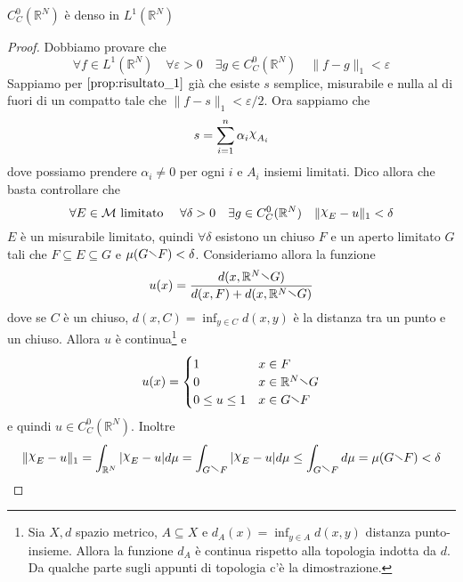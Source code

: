 \begin{proposition}\label{prop:risultato_2}
    \(C_C^{0}{(\mathbb{R}^{N})}\) è denso in \(L^1(\mathbb{R}^{N})\)
\end{proposition}
\begin{proof}
    Dobbiamo provare che 
    \[
        \forall f \in L^1(\mathbb{R}^{N}) \quad \forall \varepsilon > 0 \quad \exists g \in C_C^{0}{(\mathbb{R}^{N})} \quad \|f - g\|_1 < \varepsilon
    \]
    Sappiamo per \(\ref{prop:risultato_1}\) già che esiste \(s\) semplice, misurabile e nulla al di fuori di un
    compatto tale che \(\|f - s\|_1 < \varepsilon/2\). Ora sappiamo che
    \[
        s = \sum_{i=1}^{n} \alpha_i \rchi_{A_i}
    \]
    dove possiamo prendere \(\alpha_{i} \neq 0\) per ogni \(i\) e \(A_{i}\)
    insiemi limitati. Dico allora che basta controllare che 
    \[
        \forall E \in \mathcal{M} \text{ limitato } \quad \forall \delta > 0
        \quad \exists g \in C_C^{0}{(\mathbb{R}^{N})} \quad \|\rchi_E - u\|_1 < \delta
    \]
    \(E\)  è un misurabile limitato, quindi \(\forall \delta\) esistono un
    chiuso \(F\) e un aperto limitato \(G\) tali che \(F \subseteq E \subseteq G \) e
    \(\mu {( G \sminus F )} < \delta\). Consideriamo allora la funzione 
    \[
        u{(x)} = \frac{d{(x, \mathbb{R}^{N} \sminus G)}}{d{(x, F)} + d{(x, \mathbb{R}^{N} \sminus G)}}
    \]
    dove se \(C\) è un chiuso, \(d{(x, C)} = \inf_{y \in C} d{(x, y)}\) è la
    distanza tra un punto e un chiuso. Allora \(u\) è continua\footnote{
        Sia \(X, d\) spazio metrico, \(A \subseteq X \) e \(d_A{(x)} = \inf_{y
        \in A} d(x, y)\) distanza punto-insieme. Allora la funzione \(d_A\) è
        continua rispetto alla topologia indotta da \(d\). Da qualche parte
        sugli appunti di topologia c'è la dimostrazione.
    } e
    \[
        u{(x)} = \begin{cases}
            1 & x \in F  \\
            0 & x \in \mathbb{R}^{N} \sminus G \\
            0 \le u \le 1 & x \in G \sminus F
        \end{cases}
    \]
    e quindi \(u \in C_C^{0}{(\mathbb{R}^{N})}\). Inoltre
    \[
        \|\rchi_E - u\|_1 = \int_{\mathbb{R}^{N}} |\rchi_E - u| d\mu = \int_{G
        \sminus F} |\rchi_E - u| d\mu \le \int_{G \sminus F} d\mu =\mu{(G \sminus F)}< \delta 
    \]
\end{proof}

